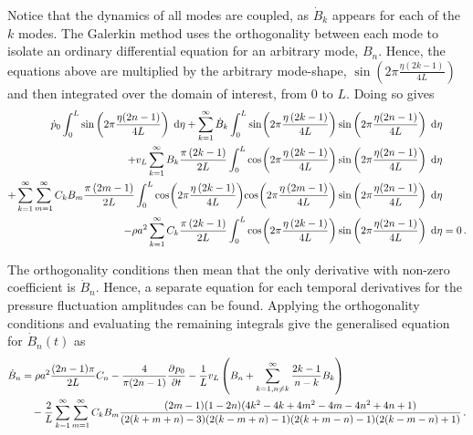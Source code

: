 Notice that the dynamics of all modes are coupled, as $\dot{B}_k$ appears for each of the $k$ modes. The Galerkin method uses the orthogonality between each mode to isolate an ordinary differential equation for an arbitrary mode, $B_n$. Hence, the equations above are multiplied by the arbitrary mode-shape, $\sin\left(2\pi\frac{\eta(2k-1)}{4L}\right)$ and then integrated over the domain of interest, from $0$ to $L$. Doing so gives
~
\begin{equation*}
\begin{split}
    \dot{p}_0 \int^L_0 \sin\left(2\pi\frac{\eta(2n-1)}{4L}\right) \Idx{\eta}
    + \sum_{k=1}^{\infty} \dot{B}_k \int^L_0 \fun{sin}{2\pi \frac{\eta \left( 2 k - 1 \right)}{4L}} \sin\left(2\pi\frac{\eta(2n-1)}{4L}\right) \Idx{\eta}
    & \\ %
    + v_L \sum_{k=1}^{\infty} B_k \frac{\pi \left( 2 k - 1 \right)}{2L} \int^L_0 \fun{cos}{2\pi \frac{\eta \left( 2 k - 1 \right)}{4L}} \sin\left(2\pi\frac{\eta(2n-1)}{4L}\right) \Idx{\eta}
    & \\ %
    + \sum_{k=1}^{\infty} \sum_{m=1}^{\infty} C_k B_m \frac{\pi \left( 2 m - 1 \right)}{2L} \int^L_0 \fun{cos}{2\pi \frac{\eta \left( 2 k - 1 \right)}{4L}} \fun{cos}{2\pi \frac{\eta \left( 2 m - 1 \right)}{4L}} \sin\left(2\pi\frac{\eta(2n-1)}{4L}\right) \Idx{\eta}
    & \\ %
    - \rho a^2 \sum_{k=1}^{\infty} C_k \frac{\pi \left( 2 k - 1 \right)}{2L} \int^L_0 \fun{cos}{2\pi \frac{\eta \left( 2 k - 1 \right)}{4L}} \sin\left(2\pi\frac{\eta(2n-1)}{4L}\right) \Idx{\eta}
    &= 0 \, .
\end{split}
\end{equation*}

The orthogonality conditions then mean that the only derivative with non-zero coefficient is $\dot{B}_n$. Hence, a separate equation for each temporal derivatives for the pressure fluctuation amplitudes can be found. Applying the orthogonality conditions and evaluating the remaining integrals give the generalised equation for $\dot{B}_n(t)$ as
~
\begin{equation*}
\begin{split}
    \dot{B}_n &=
    \rho a^2 \frac{(2n-1)\pi}{2L} C_n
    - \frac{4}{\pi(2n-1)} \pdiff{p_0}{t}
    - \frac{1}{L} v_L \left( B_n + \sum^{\infty}_{k = 1,n \neq k} \frac{2k-1}{n-k} B_k \right)
    \\ & \quad
    - \frac{2}{L} \sum^{\infty}_{k=1} \sum^{\infty}_{m=1} C_k B_m \frac{
    (2m-1)(1-2n)(4k^2 - 4k + 4m^2 - 4m - 4n^2 + 4n + 1)
    }{
    (2(k+m+n)-3)(2(k-m+n)-1)(2(k+m-n)-1)(2(k-m-n)+1)
    } \, .
\end{split}
\end{equation*}

